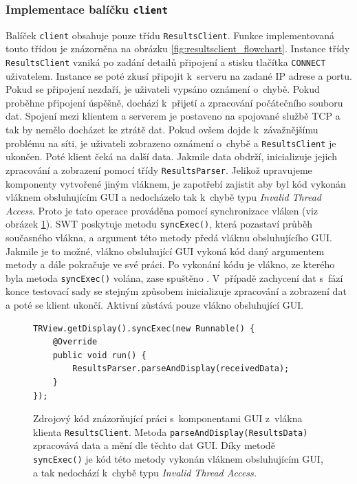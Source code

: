       \subsubsection{Implementace balíčku \texttt{client}}
      Balíček \texttt{client} obsahuje pouze třídu \texttt{ResultsClient}. Funkce implementovaná touto třídou je znázorněna na obrázku \ref{fig:resultsclient_flowchart}. Instance třídy \texttt{ResultsClient} vzniká po zadání detailů připojení a stisku tlačítka \texttt{CONNECT} uživatelem. Instance se poté zkusí připojit k~serveru na zadané IP adrese a portu. Pokud se připojení nezdaří, je uživateli vypsáno oznámení o~chybě. Pokud proběhne připojení úspěšně, dochází k~přijetí a zpracování počátečního souboru dat. Spojení mezi klientem a serverem je postaveno na spojované službě TCP a tak by nemělo docházet ke ztrátě dat. Pokud ovšem dojde k~závažnějšímu problému na síti, je uživateli zobrazeno oznámení o~chybě a \texttt{ResultsClient} je ukončen. Poté klient čeká na další data. Jakmile data obdrží, inicializuje jejich zpracování a zobrazení pomocí třídy \texttt{ResultsParser}. Jelikož upravujeme komponenty vytvořené jiným vláknem, je zapotřebí zajistit aby byl kód vykonán vláknem obsluhujícím GUI a nedocházelo tak k~chybě typu \emph{Invalid Thread Access}. Proto je tato operace prováděna pomocí synchronizace vláken (viz obrázek \ref{code:syncExec}). SWT poskytuje metodu \texttt{syncExec()}, která pozastaví průběh současného vlákna, a argument této metody předá vláknu obsluhujícího GUI. Jakmile je to možné, vlákno obsluhující GUI vykoná kód daný argumentem metody a dále pokračuje ve své práci. Po vykonání kódu je vlákno, ze kterého byla metoda \texttt{syncExec()} volána, zase spuštěno \cite{codeaffine-asyncexec}. V~případě zachycení dat s~fází konce testovací sady se stejným způsobem inicializuje zpracování a zobrazení dat a poté se klient ukončí. Aktivní zůstává pouze vlákno obsluhující GUI.

      	\lstset{language=java}
	\begin{figure}
	  \begin{lstlisting}[frame=single]
TRView.getDisplay().syncExec(new Runnable() {
	@Override
	public void run() {
		ResultsParser.parseAndDisplay(receivedData);
	}
});
	  \end{lstlisting}
	  \caption{Zdrojový kód znázorňující práci s~komponentami GUI z~vlákna klienta \texttt{ResultsClient}. Metoda \texttt{parseAndDisplay(ResultsData)} zpracovává data a mění dle těchto dat GUI. Díky metodě \texttt{syncExec()} je kód této metody vykonán vláknem obsluhujícím GUI, a tak nedochází k~chybě typu \emph{Invalid Thread Access.}}
	  \label{code:syncExec}
	\end{figure}

